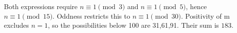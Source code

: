 Both expressions require $n\equiv 1\pmod 3$ and $n\equiv 1\pmod 5$, hence $n\equiv 1\pmod{15}$. Oddness restricts this to $n\equiv 1\pmod{30}$. Positivity of m excludes $n=1$, so the possibilities below 100 are 31,61,91. Their sum is $\boxed{183}$.
